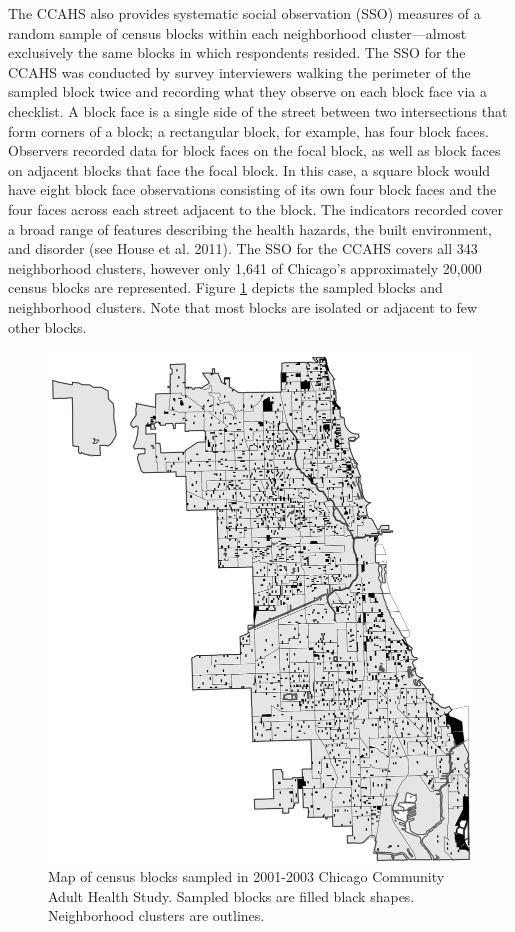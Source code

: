 \documentclass [11pt, proquest] {uwthesis}[2015/03/03]
\begin{document}
The CCAHS also provides systematic social observation (SSO) measures of a random sample of census blocks within each neighborhood cluster---almost exclusively the same blocks in which respondents resided. The SSO for the CCAHS was conducted by survey interviewers walking the perimeter of the sampled block twice and recording what they observe on each block face via a checklist. A block face is a single side of the street between two intersections that form corners of a block; a rectangular block, for example, has four block faces. Observers recorded data for block faces on the focal block, as well as block faces on adjacent blocks that face the focal block. In this case, a square block would have eight block face observations consisting of its own four block faces and the four faces across each street adjacent to the block. The indicators recorded cover a broad range of features describing the health hazards, the built environment, and disorder (see House et al. 2011). The SSO for the CCAHS covers all 343 neighborhood clusters, however only 1,641 of Chicago's approximately 20,000 census blocks are represented. Figure \ref{fig:blocksample} depicts the sampled blocks and neighborhood clusters. Note that most blocks are isolated or adjacent to few other blocks.
\begin{figure}

{\centering \includegraphics[width=0.93\linewidth]{./figure/ch2/boundary_map} 

}

\caption{Map of census blocks sampled in 2001-2003 Chicago Community Adult Health Study. Sampled blocks are filled black shapes. Neighborhood clusters are outlines. }\label{fig:blocksample}
\end{figure}
\end{document}

